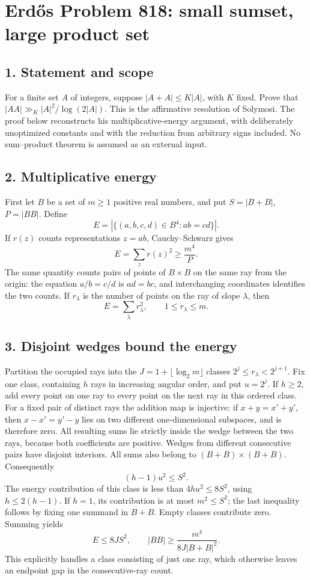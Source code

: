 \section*{Erd\H{o}s Problem 818: small sumset, large product set}
\subsection*{1. Statement and scope}
For a finite set $A$ of integers, suppose $|A+A|\le K|A|$, with $K$ fixed. Prove that $|AA|\gg_K |A|^2/\log(2|A|)$. This is the affirmative resolution of Solymosi. The proof below reconstructs his multiplicative-energy argument, with deliberately unoptimized constants and with the reduction from arbitrary signs included. No sum--product theorem is assumed as an external input.
\subsection*{2. Multiplicative energy}
First let $B$ be a set of $m\ge1$ positive real numbers, and put $S=|B+B|$, $P=|BB|$. Define
\[
 E=|\{(a,b,c,d)\in B^4:ab=cd\}|.
\]
If $r(z)$ counts representations $z=ab$, Cauchy--Schwarz gives
\[
 E=\sum_zr(z)^2\ge \frac{m^4}{P}.                 \tag{1}
\]
The same quantity counts pairs of points of $B\times B$ on the same ray from the origin: the equation $a/b=c/d$ is $ad=bc$, and interchanging coordinates identifies the two counts. If $r_\lambda$ is the number of points on the ray of slope $\lambda$, then
\[
 E=\sum_\lambda r_\lambda^2,\qquad 1\le r_\lambda\le m.
\]
\subsection*{3. Disjoint wedges bound the energy}
Partition the occupied rays into the $J=1+\lfloor\log_2m\rfloor$ classes $2^j\le r_\lambda<2^{j+1}$. Fix one class, containing $h$ rays in increasing angular order, and put $u=2^j$.
If $h\ge2$, add every point on one ray to every point on the next ray in this ordered class. For a fixed pair of distinct rays the addition map is injective: if $x+y=x'+y'$, then $x-x'=y'-y$ lies on two different one-dimensional subspaces, and is therefore zero. All resulting sums lie strictly inside the wedge between the two rays, because both coefficients are positive. Wedges from different consecutive pairs have disjoint interiors. All sums also belong to $(B+B)\times(B+B)$. Consequently
\[
 (h-1)u^2\le S^2.
\]
The energy contribution of this class is less than $4hu^2\le8S^2$, using $h\le2(h-1)$. If $h=1$, its contribution is at most $m^2\le S^2$; the last inequality follows by fixing one summand in $B+B$. Empty classes contribute zero. Summing yields
\[
 E\le8J S^2,\qquad |BB|\ge\frac{m^4}{8J|B+B|^2}.       \tag{2}
\]
This explicitly handles a class consisting of just one ray, which otherwise leaves an endpoint gap in the consecutive-ray count.
